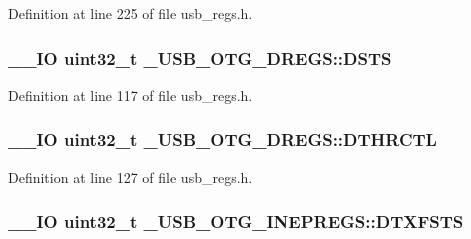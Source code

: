 Definition at line 225 of file usb\-\_\-regs.\-h.

\hypertarget{group___u_s_b___o_t_g___d_r_i_v_e_r_gab3b0f0e7ce31a08207236f244f9d4873}{
\subsubsection[{D\-S\-T\-S}]{\setlength{\rightskip}{0pt plus 5cm}\-\_\-\-\_\-\-I\-O {\bf uint32\-\_\-t} \-\_\-\-U\-S\-B\-\_\-\-O\-T\-G\-\_\-\-D\-R\-E\-G\-S\-::\-D\-S\-T\-S}}\label{group___u_s_b___o_t_g___d_r_i_v_e_r_gab3b0f0e7ce31a08207236f244f9d4873}


Definition at line 117 of file usb\-\_\-regs.\-h.

\hypertarget{group___u_s_b___o_t_g___d_r_i_v_e_r_ga1e35964a6faafc7b32069468c2140b83}{
\subsubsection[{D\-T\-H\-R\-C\-T\-L}]{\setlength{\rightskip}{0pt plus 5cm}\-\_\-\-\_\-\-I\-O {\bf uint32\-\_\-t} \-\_\-\-U\-S\-B\-\_\-\-O\-T\-G\-\_\-\-D\-R\-E\-G\-S\-::\-D\-T\-H\-R\-C\-T\-L}}\label{group___u_s_b___o_t_g___d_r_i_v_e_r_ga1e35964a6faafc7b32069468c2140b83}


Definition at line 127 of file usb\-\_\-regs.\-h.

\hypertarget{group___u_s_b___o_t_g___d_r_i_v_e_r_ga3202292a0e13e390381086f93ad3e8b9}{
\subsubsection[{D\-T\-X\-F\-S\-T\-S}]{\setlength{\rightskip}{0pt plus 5cm}\-\_\-\-\_\-\-I\-O {\bf uint32\-\_\-t} \-\_\-\-U\-S\-B\-\_\-\-O\-T\-G\-\_\-\-I\-N\-E\-P\-R\-E\-G\-S\-::\-D\-T\-X\-F\-S\-T\-S}}\label{group___u_s_b___o_t_g___d_r_i_v_e_r_ga3202292a0e13e390381086f93ad3e8b9}


